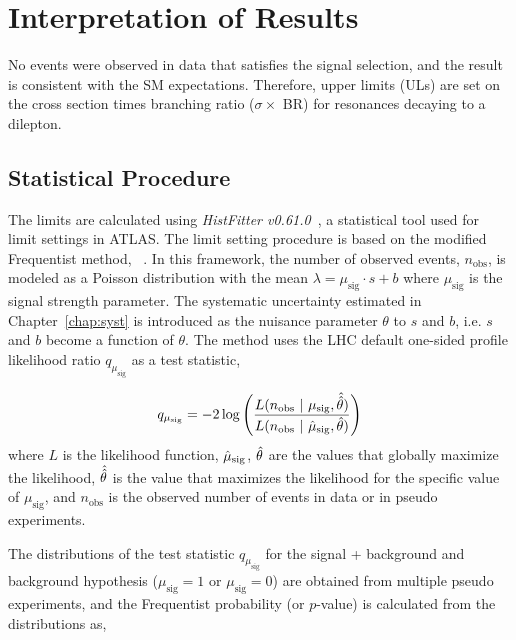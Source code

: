 \chapter{Interpretation of Results}
\label{chap:upper_limit}

No events were observed in data that satisfies the signal selection, and the result is consistent with the SM expectations. Therefore, upper limits (ULs) are set on the cross section times branching ratio ($\sigma \times$ BR) for resonances decaying to a dilepton.

\section{Statistical Procedure}
The limits are calculated using \textit{HistFitter v0.61.0}~\cite{Baak:2014wma}, a statistical tool used for limit settings in ATLAS. The limit setting procedure is based on the modified Frequentist method, \CLs~\cite{OBRAZTSOV1992388,PhysRevD.57.3873}. In this framework, the number of observed events, $n_{\mathrm{obs}}$, is modeled as a Poisson distribution with the mean $\lambda = \mu_{\mathrm{sig}}\cdot s + b$ where $\mu_{\mathrm{sig}}$ is the signal strength parameter. The systematic uncertainty estimated in Chapter~\ref{chap:syst} is introduced as the nuisance parameter $\theta$ to $s$ and $b$, i.e. $s$ and $b$ become a function of $\theta$. The method uses the LHC default one-sided profile likelihood ratio $q_{\mu_{\mathrm{sig}}}$ as a test statistic,

\begin{equation}
q_{\mu_{\mathrm{sig}}} = -2 \log \Bigg( \dfrac{L(n_\mathrm{obs}~|~\mu_{\mathrm{sig}}, \Hat{\Hat{\theta}})}{L(n_\mathrm{obs}~|~\Hat{\mu}_{\mathrm{sig}}, \Hat{\theta})}\Bigg)
\label{eq:test_statistic}
\end{equation}
%
where $L$ is the likelihood function, $\Hat{\mu}_{\mathrm{sig}}$, $\Hat{\theta}$ are the values that globally maximize the likelihood, $\Hat{\Hat{\theta}}$ is the value that maximizes the likelihood for the specific value of $\mu_{\mathrm{sig}}$, and $n_{\mathrm{obs}}$ is the observed number of events in data or in pseudo experiments.

The distributions of the test statistic $q_{\mu_{\mathrm{sig}}}$ for the signal + background and background hypothesis ($\mu_{\mathrm{sig}} = 1$ or $\mu_{\mathrm{sig}} = 0$) are obtained from multiple pseudo experiments, and the Frequentist probability (or $p$-value) is calculated from the distributions as,

